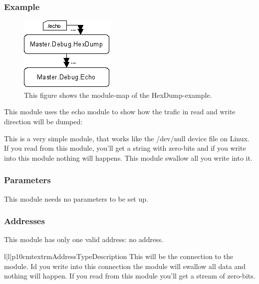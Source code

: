 \subsubsection{Example}
\begin{figure}[ht]
    \label{fig:coremod05.py}
    \centering
    \includegraphics{coremod05.png}
    \caption{This figure shows the module-map of the HexDump-example.}
\end{figure}    
This module uses the echo module to show how the trafic in read and write 
direction will be dumped:




%
%
This is a very simple module, that works like the /dev/null device file on 
Linux. If you read from this module, you'll get a string with zero-bits and
if you write into this module nothing will happens. This module swallow all
you write into it.

\subsubsection{Parameters}
This module needs no parameters to be set up.

\subsubsection{Addresses}
This module has only one valid address: no address.
\begin{tableiii}{l|l|p{10cm}}{textrm}{Address}{Type}{Description}
\lineiii{---}
        {}
        {This will be the connection to the  module. Id you
         write into this connection the module will swallow all data and
         nothing will happen. If you read from this module you'll get a 
         stream of zero-bits.}
\end{tableiii}

